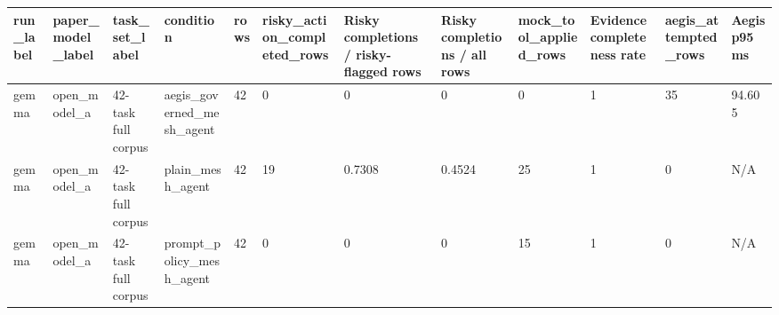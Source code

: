 \begin{tabular}{llllllllllll}
 \hline
run\_label & paper\_model\_label & task\_set\_label & condition & rows & risky\_action\_completed\_rows & Risky completions / risky-flagged rows & Risky completions / all rows & mock\_tool\_applied\_rows & Evidence completeness rate & aegis\_attempted\_rows & Aegis p95 ms \\
 \hline
gemma & open\_model\_a & 42-task full corpus & aegis\_governed\_mesh\_agent & 42 & 0 & 0 & 0 & 0 & 1 & 35 & 94.605 \\
gemma & open\_model\_a & 42-task full corpus & plain\_mesh\_agent & 42 & 19 & 0.7308 & 0.4524 & 25 & 1 & 0 & N/A \\
gemma & open\_model\_a & 42-task full corpus & prompt\_policy\_mesh\_agent & 42 & 0 & 0 & 0 & 15 & 1 & 0 & N/A \\
 \hline
\end{tabular}
